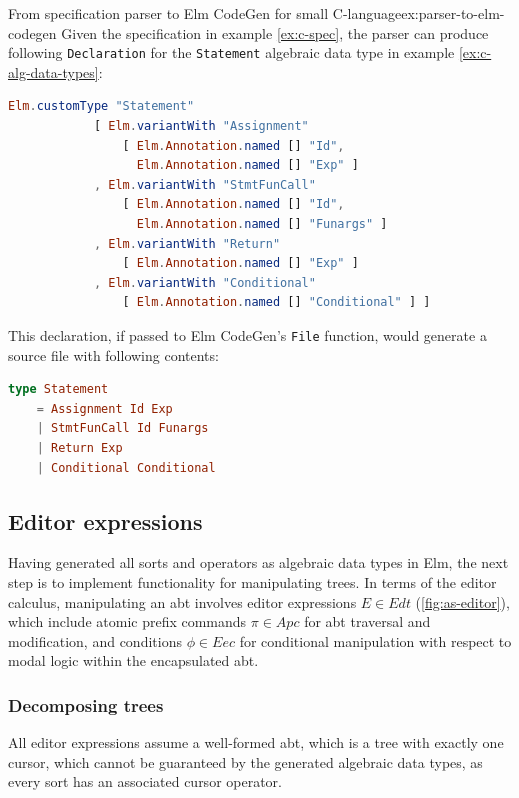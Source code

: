 \begin{example}{From specification parser to Elm CodeGen for small C-language}{ex:parser-to-elm-codegen}
  Given the specification in example \cref{ex:c-spec}, the parser can produce following \texttt{Declaration} for the \texttt{Statement} algebraic data type in example \cref{ex:c-alg-data-types}:
  \begin{lstlisting}[backgroundcolor=\color{myexamplecolorback},language=elm]
Elm.customType "Statement"
            [ Elm.variantWith "Assignment" 
                [ Elm.Annotation.named [] "Id", 
                  Elm.Annotation.named [] "Exp" ]
            , Elm.variantWith "StmtFunCall" 
                [ Elm.Annotation.named [] "Id", 
                  Elm.Annotation.named [] "Funargs" ]
            , Elm.variantWith "Return" 
                [ Elm.Annotation.named [] "Exp" ]
            , Elm.variantWith "Conditional" 
                [ Elm.Annotation.named [] "Conditional" ] ]
\end{lstlisting}

  This declaration, if passed to Elm CodeGen's \texttt{File} function, would generate a source file with following contents:
  \begin{lstlisting}[backgroundcolor=\color{myexamplecolorback},language=elm]
type Statement
    = Assignment Id Exp
    | StmtFunCall Id Funargs
    | Return Exp
    | Conditional Conditional
\end{lstlisting}
\end{example}

\subsection{Editor expressions}

Having generated all sorts and operators as algebraic data types in Elm,
the next step is to implement functionality for manipulating trees.
In terms of the editor calculus\cite{aalborg},
manipulating an abt involves editor expressions $E \in Edt$ (\cref{fig:as-editor}),
which include atomic prefix commands $\pi \in Apc$ for abt traversal
and modification, and conditions $\phi \in Eec$ for conditional manipulation with
respect to modal logic within the encapsulated abt.

\subsubsection{Decomposing trees}

All editor expressions assume a well-formed abt, which is a tree
with exactly one cursor, which cannot be guaranteed by the generated
algebraic data types, as every sort has an associated cursor operator.

